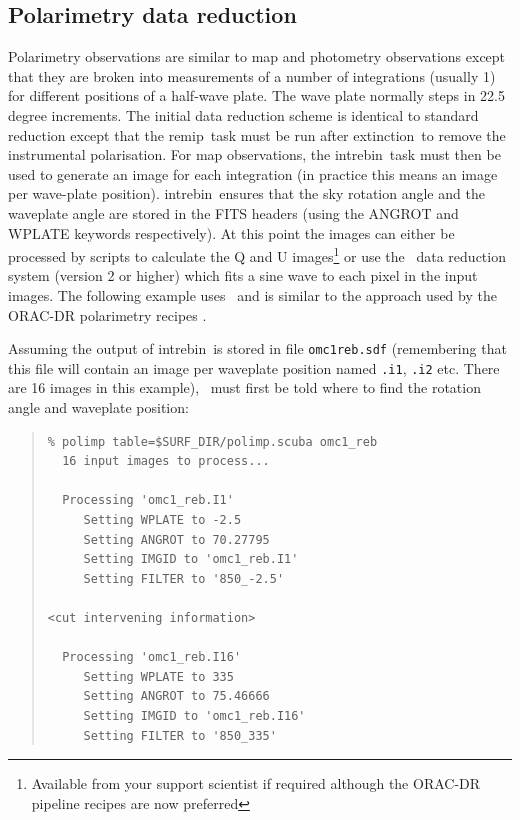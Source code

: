 \documentclass[twoside,11pt]{article}
\newcommand{\polpack}{\xref{{\sc{Polpack}}}{sun223}{}}
\newcommand{\task}[1]{{\sf #1}}
\newcommand{\intrebin}{\htmlref{\task{intrebin}}{INTREBIN}}
\newcommand{\ext}{\htmlref{\task{extinction}}{EXTINCTION}}
\newcommand{\remip}{\htmlref{\task{remip}}{REMIP}}
\newenvironment{myquote}{\begin{quote}\begin{small}}{\end{small}\end{quote}}
\newcommand{\htmlref}[2]{#1}
\newcommand{\xref}[3]{#1}
\newcommand{\xlabel}[1]{}
\renewcommand{\_}{\texttt{\symbol{95}}}
\begin{document}
\subsection{\xlabel{scupol}Polarimetry data reduction\label{scupol}}

Polarimetry observations are similar to map and photometry observations except
that they are broken into measurements of a number of integrations (usually 1)
for different positions of a half-wave plate. The wave plate normally steps in
22.5 degree increments. The initial data reduction scheme is identical to
standard reduction except that the \remip\ task must be run after \ext\ to
remove the instrumental polarisation.  For map observations, the \intrebin\
task must then be used to generate an image for each integration (in practice
this means an image per wave-plate position). \intrebin\ ensures that the sky
rotation angle and the waveplate angle are stored in the FITS headers (using
the ANGROT and WPLATE keywords respectively). At this point the images can
either be processed by scripts to calculate the Q and U
images\footnote{Available from your support scientist if required although the
ORAC-DR pipeline recipes are now preferred} or use the
\polpack\ data reduction system (version 2 or higher) which fits a sine wave
to each pixel in the input images. The following example uses \polpack\ and is
similar to the approach used by the ORAC-DR \cite{oracdr} polarimetry recipes \cite{scuorac}.

Assuming the output of \intrebin\ is stored in file \texttt{omc1\_reb.sdf}
(remembering that this file will contain an image per waveplate position named
\texttt{.i1}, \texttt{.i2} etc. There are 16 images in this example),
\polpack\ must first be told where to find the rotation angle and waveplate
position:

\begin{myquote}
\begin{verbatim}
% polimp table=$SURF_DIR/polimp.scuba omc1_reb
  16 input images to process...

  Processing 'omc1_reb.I1'
     Setting WPLATE to -2.5
     Setting ANGROT to 70.27795
     Setting IMGID to 'omc1_reb.I1'
     Setting FILTER to '850_-2.5'

<cut intervening information>

  Processing 'omc1_reb.I16'
     Setting WPLATE to 335
     Setting ANGROT to 75.46666
     Setting IMGID to 'omc1_reb.I16'
     Setting FILTER to '850_335'
\end{verbatim}
\end{myquote}
\end{document}
